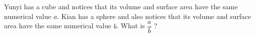 Yunyi has a cube and notices that its volume and surface area have the same numerical value $a$. Kian has a sphere and also notices that its volume and surface area have the same numerical value $b$. What is $\dfrac{a}{b}$ ?
